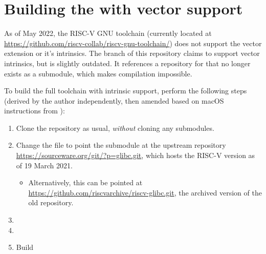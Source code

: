 \chapter{Building the  with vector support}\label{appx:building_rvv_gcc_toolchain}

As of May 2022, the RISC-V GNU toolchain (currently located at \url{https://github.com/riscv-collab/riscv-gnu-toolchain/}) does not support the vector extension or it's intrinsics.
The  branch of this repository claims to support vector intrinsics, but is slightly outdated.
It references a repository for  that no longer exists as a submodule, which makes compilation impossible.

To build the full toolchain with intrinsic support, perform the following steps (derived by the author independently, then amended based on macOS instructions from ):
\begin{enumerate}
    \item Clone the repository as usual, \emph{without} cloning any submodules.
    \item Change the  file to point the  submodule at the upstream  repository \url{https://sourceware.org/git/?p=glibc.git}, which hosts the RISC-V version as of 19 March 2021.
    
    \begin{itemize}
        \item Alternatively, this can be pointed at \url{https://github.com/riscvarchive/riscv-glibc.git}, the archived version of the old repository.
    \end{itemize}
    
    \item {}
    \item {}
    \item Build
\end{enumerate}

